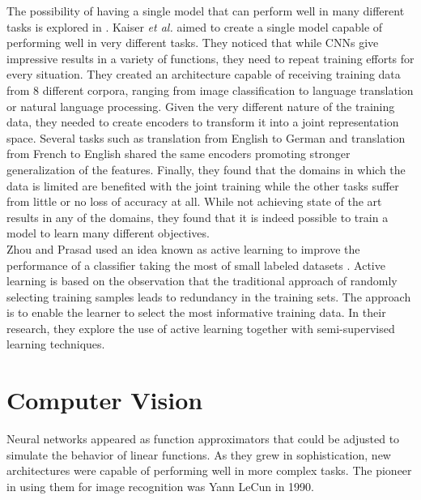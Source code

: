 The possibility of having a single model that can perform well in many different tasks is explored in \cite{DBLP:journals/corr/KaiserGSVPJU17}. Kaiser \textit{et al.} aimed to create a single model capable of performing well in very different tasks. They noticed that while CNNs give impressive results in a variety of functions, they need to repeat training efforts for every situation. They created an architecture capable of receiving training data from 8 different corpora, ranging from image classification to language translation or natural language processing. Given the very different nature of the training data, they needed to create encoders to transform it into a joint representation space. Several tasks such as translation from English to German and translation from French to English shared the same encoders promoting stronger generalization of the features. Finally, they found that the domains in which the data is limited are benefited with the joint training while the other tasks suffer from little or no loss of accuracy at all. While not achieving state of the art results in any of the domains, they found that it is indeed possible to train a model to learn many different objectives. \\


Zhou and Prasad used an idea known as active learning to improve the performance of a classifier taking the most of small labeled datasets \cite{7956153}. Active learning is based on the observation that the traditional approach of randomly selecting training samples leads to redundancy in the training sets. The approach is to enable the learner to select the most informative training data. In their research, they explore the use of active learning together with semi-supervised learning techniques.\\

\section{Computer Vision}

Neural networks appeared as function approximators that could be adjusted to simulate the behavior of linear functions. As they grew in sophistication, new architectures were capable of performing well in more complex tasks. The pioneer in using them for image recognition was Yann LeCun in 1990.\\

